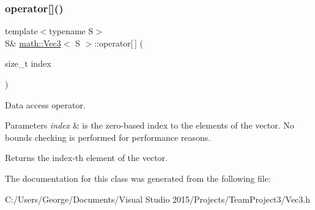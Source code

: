 \subsubsection{\texorpdfstring{operator[]()}{operator[]()}}
{\footnotesize\ttfamily template$<$typename S$>$ \\
S\& \hyperlink{classmath_1_1_vec3}{math\+::\+Vec3}$<$ S $>$\+::operator\mbox{[}$\,$\mbox{]} (\begin{DoxyParamCaption}\item[{size\+\_\+t}]{index }\end{DoxyParamCaption})\hspace{0.3cm}{\ttfamily [inline]}}

Data access operator.


\begin{DoxyParams}{Parameters}
{\em index} & is the zero-\/based index to the elements of the vector. No bounds checking is performed for performance reasons.\\
\hline
\end{DoxyParams}
\begin{DoxyReturn}{Returns}
the index-\/th element of the vector. 
\end{DoxyReturn}


The documentation for this class was generated from the following file\+:\begin{DoxyCompactItemize}
\item 
C\+:/\+Users/\+George/\+Documents/\+Visual Studio 2015/\+Projects/\+Team\+Project3/Vec3.\+h\end{DoxyCompactItemize}
